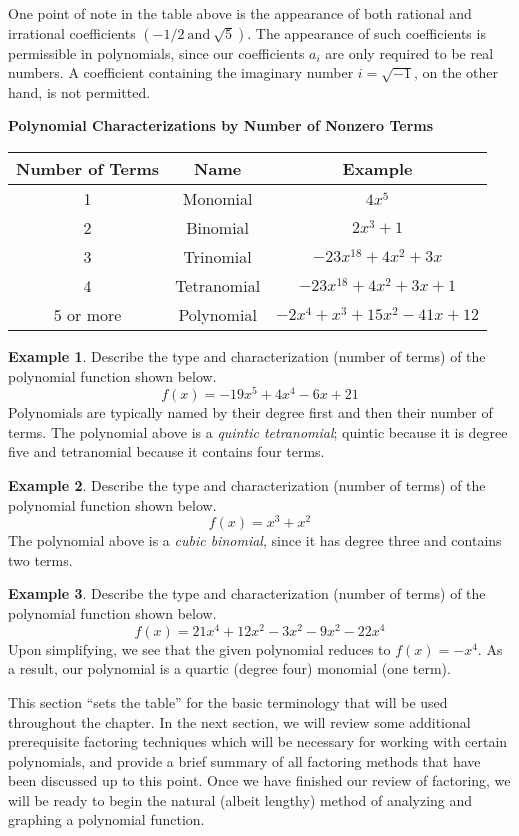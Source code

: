 \documentclass[12pt]{book}
\theoremstyle{definition}
\newtheorem{example}{Example}
\begin{document}
One point of note in the table above is the appearance of both rational and irrational coefficients $\left(-1/2 \ \text{and} \ \sqrt{5}\right)$.  The appearance of such coefficients is permissible in polynomials, since our coefficients $a_i$ are only required to be real numbers.  A coefficient containing the imaginary number $i=\sqrt{-1}$, on the other hand, is not permitted.
\par
\begin{center}
{\bf Polynomial Characterizations by Number of Nonzero Terms}
\par
\begin{tabular}{ | c | c | c | } 
\hline
Number of Terms & Name & Example \\ 
\hline
1 & Monomial & $4x^5$ \\ 
\hline
2 & Binomial & $2x^3 +1$ \\ 
\hline
3 & Trinomial & $-23x^{18} +4x^2+3x$ \\ 
\hline
4 & Tetranomial & $-23x^{18} +4x^2+3x + 1$ \\ 
\hline
5 or more & Polynomial & $-2x^4 + x^3 +15x^2-41x + 12$ \\ 
\hline
\end{tabular}
\end{center}
\begin{example} Describe the type and characterization (number of terms) of the polynomial function shown below.
$$f(x) = -19x^5+4x^4-6x+21$$
Polynomials are typically named by their degree first and then their number of terms.  The polynomial above is a {\it quintic tetranomial}; quintic because it is degree five and tetranomial because it contains four terms.
\end{example}
\begin{example} Describe the type and characterization (number of terms) of the polynomial function shown below.
$$f(x) = x^3+x^2$$
The polynomial above is a {\it cubic binomial}, since it has degree three and contains two terms. 
\end{example}
\begin{example} Describe the type and characterization (number of terms) of the polynomial function shown below.
$$f(x) = 21x^4+12x^2-3x^2-9x^2-22x^4$$
Upon simplifying, we see that the given polynomial reduces to $f(x)=-x^4$.  As a result, our polynomial is a quartic (degree four) monomial (one term).
\end{example}
This section ``sets the table'' for the basic terminology that will be used throughout the chapter.  In the next section, we will review some additional prerequisite factoring techniques which will be necessary for working with certain polynomials, and provide a brief summary of all factoring methods that have been discussed up to this point.  Once we have finished our review of factoring, we will be ready to begin the natural (albeit lengthy) method of analyzing and graphing a polynomial function.
\end{document}
